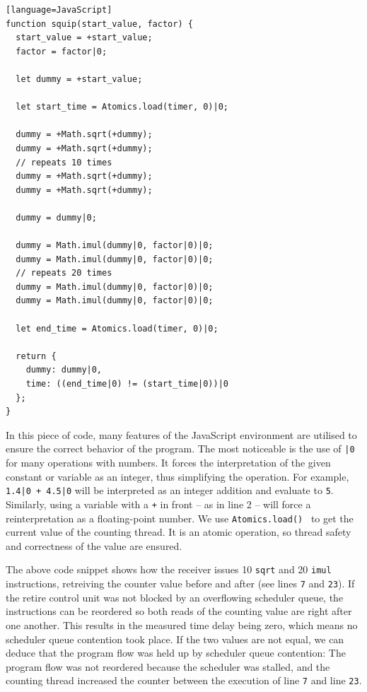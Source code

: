 \documentclass[11pt,
  titlepage=false,
]{scrreprt}
\begin{document}
\begin{lstlisting}[float][language=JavaScript]
function squip(start_value, factor) {
  start_value = +start_value;
  factor = factor|0;

  let dummy = +start_value;

  let start_time = Atomics.load(timer, 0)|0;

  dummy = +Math.sqrt(+dummy);
  dummy = +Math.sqrt(+dummy);
  // repeats 10 times
  dummy = +Math.sqrt(+dummy);
  dummy = +Math.sqrt(+dummy);

  dummy = dummy|0;

  dummy = Math.imul(dummy|0, factor|0)|0;
  dummy = Math.imul(dummy|0, factor|0)|0;
  // repeats 20 times
  dummy = Math.imul(dummy|0, factor|0)|0;
  dummy = Math.imul(dummy|0, factor|0)|0;

  let end_time = Atomics.load(timer, 0)|0;

  return {
    dummy: dummy|0,
    time: ((end_time|0) != (start_time|0))|0
  };
}
\end{lstlisting}

In this piece of code, many features of the JavaScript environment are utilised to ensure the correct behavior of the program.
The most noticeable is the use of \texttt{|0} for many operations with numbers.
It forces the interpretation of the given constant or variable as an integer, thus simplifying the operation.
For example, \texttt{1.4|0 + 4.5|0} will be interpreted as an integer addition and evaluate to \texttt{5}.
Similarly, using a variable with a \texttt{+} in front -- as in line 2 -- will force a reinterpretation as a floating-point number.
We use \texttt{Atomics.load()}~\cite{atomicsload} to get the current value of the counting thread.
It is an atomic operation, so thread safety and correctness of the value are ensured.

The above code snippet shows how the receiver issues 10 \texttt{sqrt} and 20 \texttt{imul} instructions,
retreiving the counter value before and after (see lines \texttt{7} and \texttt{23}).
If the retire control unit was not blocked by an overflowing scheduler queue,
the instructions can be reordered so both reads of the counting value are right after one another.
This results in the measured time delay being zero, which means no scheduler queue contention took place.
If the two values are not equal, we can deduce that the program flow was held up by scheduler queue contention:
The program flow was not reordered because the scheduler was stalled, and the counting thread increased the counter
between the execution of line \texttt{7} and line \texttt{23}.
\end{document}
